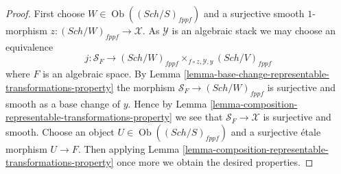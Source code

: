 \documentclass{stacks-project}
\theoremstyle{plain}
\theoremstyle{definition}
\theoremstyle{remark}
\numberwithin{equation}{subsection}
\def\Sch{\mathit{Sch}}
\def\Ob{\mathop{\mathrm{Ob}}\nolimits}
\begin{document}
\begin{proof}
First choose $W \in \Ob((\Sch/S)_{fppf})$ and a surjective
smooth $1$-morphism $z : (\Sch/W)_{fppf} \to \mathcal{X}$.
As $\mathcal{Y}$ is an algebraic stack we may choose an equivalence
$$
j :
\mathcal{S}_F
\longrightarrow
(\Sch/W)_{fppf}
\times_{f \circ z, \mathcal{Y}, y}
(\Sch/V)_{fppf}
$$
where $F$ is an algebraic space. By
Lemma \ref{lemma-base-change-representable-transformations-property}
the morphism
$\mathcal{S}_F \to (\Sch/W)_{fppf}$ is surjective and smooth
as a base change of $y$. Hence by
Lemma \ref{lemma-composition-representable-transformations-property}
we see that $\mathcal{S}_F \to \mathcal{X}$ is surjective and smooth.
Choose an object $U \in \Ob((\Sch/S)_{fppf})$
and a surjective \'etale morphism $U \to F$. Then applying
Lemma \ref{lemma-composition-representable-transformations-property}
once more we obtain the desired properties.
\end{proof}
\end{document}
